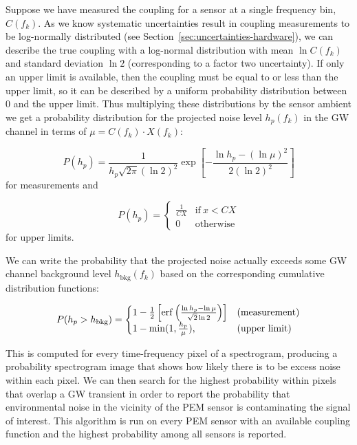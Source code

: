Suppose we have measured the coupling for a sensor at a single frequency bin, $C(f_k)$.
As we know systematic uncertainties result in coupling measurements to be log-normally distributed (see Section~\ref{sec:uncertainties-hardware}), we can describe the true coupling with a log-normal distribution with mean $\ln C(f_k)$ and standard deviation $\ln 2$ (corresponding to a factor two uncertainty).
If only an upper limit is available, then the coupling must be equal to or less than the upper limit, so it can be described by a uniform probability distribution between 0 and the upper limit.
Thus multiplying these distributions by the sensor ambient we get a probability distribution for the projected noise level $h_p(f_k)$ in the \ac{GW} channel in terms of $\mu = C(f_k) \cdot X(f_k)$:

\begin{equation}
	P(h_p) = \frac{1}{h_p \sqrt{2\pi} (\ln 2)^2} \exp \left[ -\frac{\ln h_p - (\ln \mu)^2}{2 (\ln 2)^2} \right]
\end{equation}
for measurements and

\begin{equation}
	P(h_p) =
		\begin{cases}
      \frac{1}{CX} & \text{if}\ x < CX\\
      0 & \text{otherwise}
    \end{cases}
\end{equation}
for upper limits.

We can write the probability that the projected noise actually exceeds some \ac{GW} channel background level $h_{\text{bkg}}(f_k)$ based on the corresponding cumulative distribution functions:

\begin{equation}
	P(h_p > h_{\text{bkg}}) =
		\begin{cases}
			1 - \frac{1}{2} \left[ \erf \left( \frac{\ln h_p - \ln \mu}{\sqrt{2} \ln 2} \right) \right] & \text{(measurement)}\\
			1 - \min(1, \frac{h_p}{\mu}), & \text{(upper limit)}
		\end{cases}
\end{equation}

This is computed for every time-frequency pixel of a spectrogram, producing a probability spectrogram image that shows how likely there is to be excess noise within each pixel.
We can then search for the highest probability within pixels that overlap a \ac{GW} transient in order to report the probability that environmental noise in the vicinity of the \ac{PEM} sensor is contaminating the signal of interest.
This algorithm is run on every \ac{PEM} sensor with an available coupling function and the highest probability among all sensors is reported.


